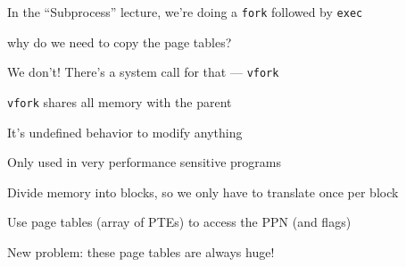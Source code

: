   \begin{slide}


    In the ``Subprocess'' lecture, we're doing a \texttt{fork} followed by
    \texttt{exec}

    \leftspace{}why do we need to copy the page tables?
    \medskip

    We don't! There's a system call for that --- \texttt{vfork}
    \medskip

    \texttt{vfork} shares all memory with the parent

    \leftspace{}It's undefined behavior to modify anything
    \medskip

    Only used in very performance sensitive programs

  \end{slide}

  \begin{slide}


    Divide memory into blocks, so we only have to translate once per block
    \medskip

    Use page tables (array of PTEs) to access the PPN (and flags)
    \medskip

    New problem: these page tables are always huge!

  \end{slide}


